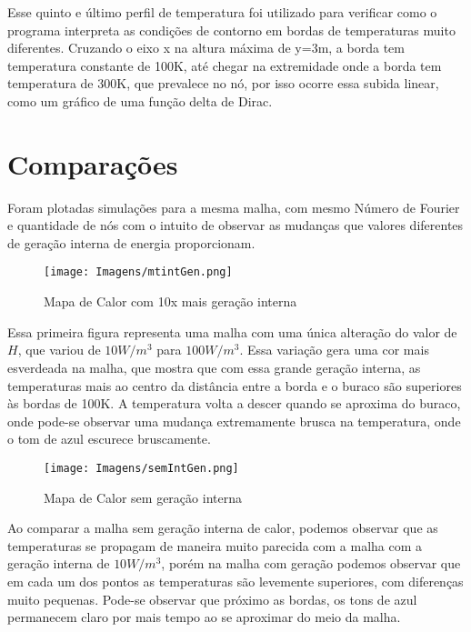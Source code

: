 \documentclass[article]{abntex2}
\begin{document}
Esse quinto e último perfil de temperatura foi utilizado para verificar como o programa interpreta as condições de contorno em bordas de temperaturas muito diferentes. Cruzando o eixo x na altura máxima de y=3m, a borda tem temperatura constante de 100K, até chegar na extremidade onde a borda tem temperatura de 300K, que prevalece no nó, por isso ocorre essa subida linear, como um gráfico de uma função delta de Dirac.

\section{Comparações}
Foram plotadas simulações para a mesma malha, com mesmo Número de Fourier e quantidade de nós com o intuito de observar as mudanças que valores diferentes de geração interna de energia proporcionam. 

\begin{figure}[H]
    \begin{center}
       
        \texttt{[image: Imagens/mtintGen.png]} 
        \caption{Mapa de Calor com 10x mais geração interna}
    \end{center}
\end{figure}

Essa primeira figura representa uma malha com uma única alteração do valor de $H$, que variou de $10W/m^3$ para $100W/m^3$. Essa variação gera uma cor mais esverdeada na malha, que mostra que com essa grande geração interna, as temperaturas mais ao centro da distância entre a borda e o buraco são superiores às bordas de 100K. A temperatura volta a descer quando se aproxima do buraco, onde pode-se observar uma mudança extremamente brusca na temperatura, onde o tom de azul escurece bruscamente. 

\begin{figure}[H]
    \begin{center}
       
        \texttt{[image: Imagens/semIntGen.png]} 
        \caption{Mapa de Calor sem geração interna}
    \end{center}
\end{figure}

Ao comparar a malha sem geração interna de calor, podemos observar que as temperaturas se propagam de maneira muito parecida com a malha com a geração interna de $10W/m^3$, porém na malha com geração podemos observar que em cada um dos pontos as temperaturas são levemente superiores, com diferenças muito pequenas. Pode-se observar que próximo as bordas, os tons de azul permanecem claro por mais tempo ao se aproximar do meio da malha.
\end{document}
